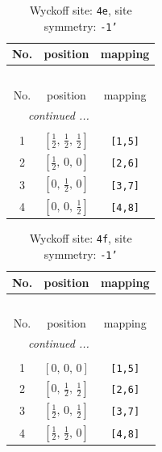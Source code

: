 \documentclass[fleqn,8pt]{jsarticle}
\begin{document}
\begin{longtable}{ccc}
\caption{Wyckoff site: {\tt 4e}, site symmetry: {\tt -1'}}
 \\
 \hline \hline
No. & position & mapping \\ \hline \endfirsthead

\multicolumn{2}{l}{\tablename\ \thetable{}} \\
 \hline \hline
No. & position & mapping \\ \hline \endhead

 \hline \hline
\multicolumn{2}{r}{\footnotesize\it continued ...} \\ \endfoot

 \hline \hline
\multicolumn{2}{r}{} \\ \endlastfoot

1 & $\left[ \frac{1}{2},\, \frac{1}{2},\, \frac{1}{2} \right]$ & {\tt [1,5]} \\ \hline
2 & $\left[ \frac{1}{2},\, 0,\, 0 \right]$ & {\tt [2,6]} \\ \hline
3 & $\left[ 0,\, \frac{1}{2},\, 0 \right]$ & {\tt [3,7]} \\ \hline
4 & $\left[ 0,\, 0,\, \frac{1}{2} \right]$ & {\tt [4,8]} \\
\end{longtable}
\renewcommand{\arraystretch}{1.2}
\begin{longtable}{ccc}
\caption{Wyckoff site: {\tt 4f}, site symmetry: {\tt -1'}}
 \\
 \hline \hline
No. & position & mapping \\ \hline \endfirsthead

\multicolumn{2}{l}{\tablename\ \thetable{}} \\
 \hline \hline
No. & position & mapping \\ \hline \endhead

 \hline \hline
\multicolumn{2}{r}{\footnotesize\it continued ...} \\ \endfoot

 \hline \hline
\multicolumn{2}{r}{} \\ \endlastfoot

1 & $\left[ 0,\, 0,\, 0 \right]$ & {\tt [1,5]} \\ \hline
2 & $\left[ 0,\, \frac{1}{2},\, \frac{1}{2} \right]$ & {\tt [2,6]} \\ \hline
3 & $\left[ \frac{1}{2},\, 0,\, \frac{1}{2} \right]$ & {\tt [3,7]} \\ \hline
4 & $\left[ \frac{1}{2},\, \frac{1}{2},\, 0 \right]$ & {\tt [4,8]} \\
\end{longtable}
\end{document}
